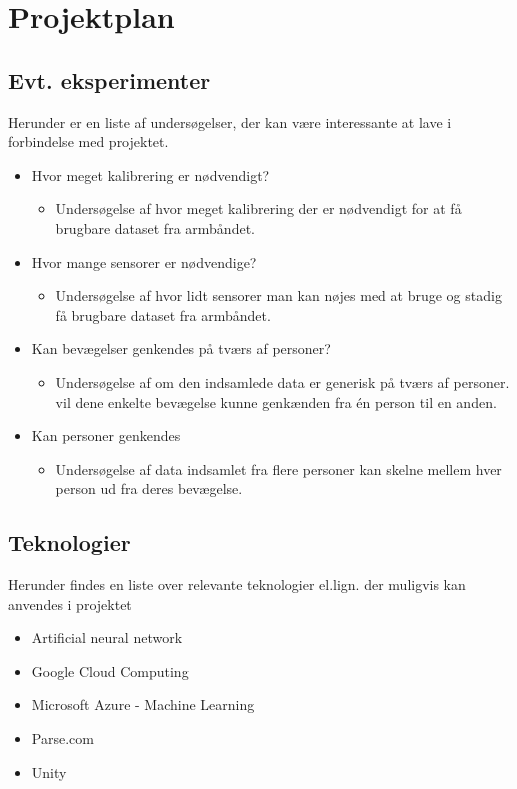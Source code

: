 \thispagestyle{fancy}
\chapter{Projektplan}
\section{Evt. eksperimenter}
Herunder er en liste af undersøgelser, der kan være interessante at lave i forbindelse med projektet.
\begin{itemize}
	\item Hvor meget kalibrering er nødvendigt?
	\begin{itemize}
		\item Undersøgelse af hvor meget kalibrering der er nødvendigt for at få brugbare dataset fra armbåndet.
	\end{itemize}
	\item Hvor mange sensorer er nødvendige?
	\begin{itemize}
		\item Undersøgelse af hvor lidt sensorer man kan nøjes med at bruge og stadig få brugbare dataset fra armbåndet.
	\end{itemize}
	\item Kan bevægelser genkendes på tværs af personer?
	\begin{itemize}
		\item Undersøgelse af om den indsamlede data er generisk på tværs af personer. vil dene enkelte bevægelse kunne genkænden fra én person til en anden.
	\end{itemize}
	\item Kan personer genkendes
	\begin{itemize}
		\item Undersøgelse af data indsamlet fra flere personer kan skelne mellem hver person ud fra deres bevægelse.
		\end{itemize}
\end{itemize}

\section{Teknologier}
Herunder findes en liste over relevante teknologier el.lign. der muligvis kan anvendes i projektet
\begin{itemize}
	\item Artificial neural network
	\item Google Cloud Computing
	\item Microsoft Azure - Machine Learning
	\item Parse.com
	\item Unity
\end{itemize}

